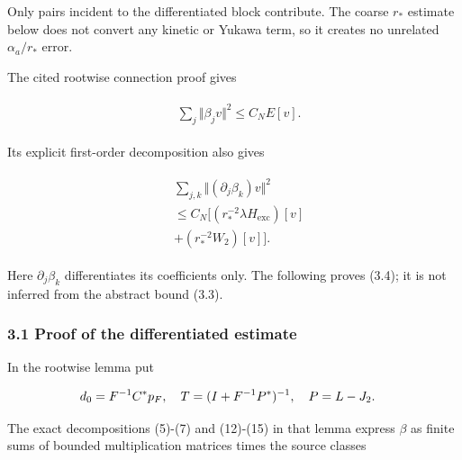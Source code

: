 Only pairs incident to the differentiated block contribute. The coarse
\(r_{*}\) estimate below does not convert any kinetic or Yukawa term, so
it creates no unrelated \(\alpha _{a}/r_{*}\) error.

The cited rootwise connection proof gives

\begin{gather*}
\begin{aligned}
& \sum _{j} \Vert \beta _{j} v\Vert ^{2} \le  C_{N} E[v].
\end{aligned}\tag{3.3}
\end{gather*}

Its explicit first-order decomposition also gives

\begin{gather*}
\begin{aligned}
& \sum _{j,k}\Vert  (\partial _{j} \beta _{k})v \Vert ^{2} \\
& \le  C_{N} [ (r_{*}^{-2} \lambda  H_{\mathrm{exc}})[v] \\
& +(r_{*}^{-2} W_{2})[v] ].
\end{aligned}\tag{3.4}
\end{gather*}

Here \(\partial _{j} \beta _{k}\) differentiates its coefficients only.
The following proves (3.4); it is not inferred from the abstract bound
(3.3).

\subsubsection{3.1 Proof of the differentiated
estimate}\label{g-proof-of-the-differentiated-estimate}

In the rootwise lemma put

\begin{gather*}
\begin{aligned}
& d_{0}=F^{-1} C^{*}p_{F}, \quad  T=(I+F^{-1} P^{*})^{-1}, \quad  P=L-J_{2}.
\end{aligned}\notag
\end{gather*}

The exact decompositions (5)-(7) and (12)-(15) in that lemma express
\(\beta\) as finite sums of bounded multiplication matrices times the
source classes

